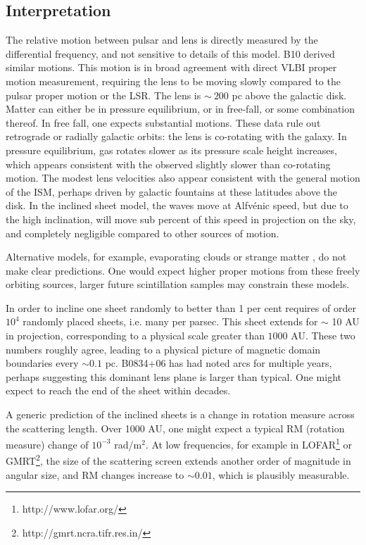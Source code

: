 \documentclass[useAMS,usenatbib]{mn2e}
\begin{document}
\subsection{Interpretation}

The relative motion between pulsar and lens is directly measured by
the differential frequency, and not sensitive to details of this
model. B10 derived similar motions.  This
motion is in broad agreement with direct VLBI proper motion
measurement, requiring the lens to be moving slowly compared to the
pulsar proper motion or the LSR.  The lens is $\sim~200$ pc above the
galactic disk.  Matter can either be in pressure equilibrium, or in
free-fall, or some combination thereof.  In free fall, one expects
substantial motions.  These data rule out retrograde or radially
galactic orbits: the lens is co-rotating with the galaxy.  In pressure
equilibrium, gas rotates slower as its pressure scale height
increases, which appears consistent with the observed slightly slower
than co-rotating motion.  The modest lens velocities also appear
consistent with the general motion of the ISM, perhaps driven by
galactic fountains \citep{1976ApJ...205..762S} at these latitudes above
the disk.  In the inclined sheet model, the waves move at Alfv\'enic
speed, but due to the high inclination, will move sub percent of this
speed in projection on the sky, and completely negligible compared to
other sources of motion.

Alternative models, for example, evaporating
clouds \citep{1998ApJ...498L.125W} or strange
matter \citep{2013PhLB..727..357P}, do not make clear predictions.  One
would expect higher proper motions from these freely orbiting sources,
larger future scintillation samples may constrain these models.

In order to incline one sheet randomly to better than 1 per cent requires of
order $10^4$ randomly placed sheets, i.e. many per parsec.  This sheet
extends for $\sim$ 10 AU in projection, corresponding to a physical
scale greater than $1000$ AU.   These two numbers roughly agree,
leading to a physical picture of magnetic domain boundaries every
$\sim 0.1$ pc.  B0834+06 has had noted arcs for multiple years,
perhaps suggesting this dominant lens plane is larger than typical.
One might expect to reach the end of the sheet within decades.

A generic prediction of the inclined sheets is a change in rotation
measure across the scattering length.  Over 1000 AU, one might expect
a typical RM (rotation measure) change of $10^{-3}$ rad/m$^2$.  At low frequencies, for
example in LOFAR\footnote{http://www.lofar.org/} or GMRT\footnote{http://gmrt.ncra.tifr.res.in/}, the size of the scattering screen extends
another order of magnitude in angular size, and RM changes increase to
$\sim 0.01$, which is plausibly measurable.
\end{document}
